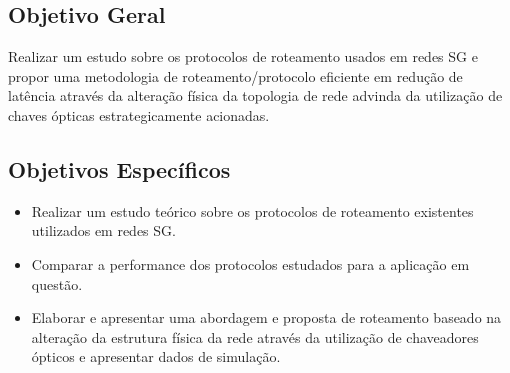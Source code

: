 \subsection{Objetivo Geral}
Realizar um estudo sobre os protocolos de roteamento usados em redes SG e propor uma metodologia de roteamento/protocolo eficiente em redução de latência através da alteração física da topologia de rede advinda da utilização de chaves ópticas estrategicamente acionadas.
\subsection{Objetivos Específicos}
\begin{itemize}
	\item Realizar um estudo teórico sobre os protocolos de roteamento existentes utilizados em redes SG.
	\item Comparar a performance dos protocolos estudados para a aplicação em questão.
	\item Elaborar e apresentar uma abordagem e proposta de roteamento baseado na alteração da estrutura física da rede através da utilização de chaveadores ópticos e apresentar dados de simulação.
\end{itemize}